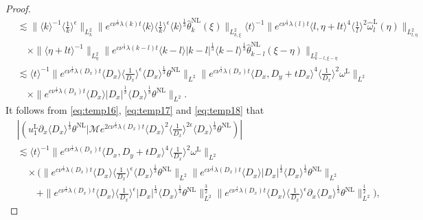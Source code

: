 \documentclass[reqno, 12pt]{amsart} %
\theoremstyle{plain} %
\theoremstyle{definition}
\theoremstyle{remark}
\numberwithin{equation}{section} %
\newcommand{\px}{\partial_x}
\begin{document}
\begin{proof}
\begin{equation}
\begin{aligned}
				&\lesssim\|\langle k\rangle^{-1}\langle\frac{1}{k}\rangle^\epsilon\|_{L_k^2}\|e^{c \nu^{\frac{1}{3}} \lambda(k) t}\langle k\rangle\langle\frac{1}{k}\rangle^\epsilon \langle k \rangle^\frac13 \hat{\theta}_k^{\mathrm{NL}}(\xi)\|_{L_{k, \xi}^2}\langle t\rangle^{-1}\|e^{c \nu^{\frac{1}{3}} \lambda(l) t}\langle l, \eta+l t\rangle^4\langle\frac{1}{l}\rangle^2 \hat{\omega}_l^{\mathrm{L}}(\eta)\|_{L_{l, \eta}^2} \\
				&\quad \times\|\langle\eta+l t\rangle^{-1}\|_{L_\eta^2}\|e^{c \nu^{\frac{1}{3}} \lambda(k-l) t} \langle k-l \rangle   |k-l|^{\frac{1}{3}} \langle k-l \rangle^\frac13  \hat{\theta}_{k-l}^{\mathrm{NL}}(\xi-\eta)\|_{L_{k-l, \xi-\eta}^2} \\
				& \lesssim \langle t\rangle^{-1}\|e^{c \nu^{\frac{1}{3}} \lambda\left(D_x\right) t}\langle D_x\rangle\langle\frac{1}{D_x}\rangle^\epsilon \langle D_x \rangle^\frac13 \theta^{\mathrm{NL}}\|_{L^2}\|e^{c \nu^{\frac{1}{3}} \lambda\left(D_x\right) t}\langle D_x, D_y+t D_x\rangle^4\langle\frac{1}{D_x}\rangle^2 \omega^{\mathrm{L}}\|_{L^2} \\
				& \quad \times  \| e^{c \nu^{\frac{1}{3}} \lambda\left(D_x\right) t} \langle D_x \rangle
				\left|D_x\right|^{\frac{1}{3}}  \langle D_x \rangle^\frac13  \theta^{\mathrm{NL}} \|_{L^2} .
		\end{aligned}\end{equation}
		It follows from \eqref{eq:temp16}, \eqref{eq:temp17} and \eqref{eq:temp18} that
		\begin{equation*}\begin{aligned}
				&\left|\left(  u_1^{\mathrm{L}} \px \langle D_x \rangle^\frac13 \theta^{\mathrm{NL}} \big| \mathcal{M} e^{2 c \nu^{\frac{1}{3}} \lambda\left(D_x\right) t}\langle D_x\rangle^2\langle\frac{1}{D_x}\rangle^{2 \epsilon} \langle D_x \rangle^\frac13 \theta^{\mathrm{NL}}\right)\right|\\
				&\lesssim \langle t\rangle^{-1}     \|e^{c \nu^{\frac{1}{3}} \lambda\left(D_x\right) t}\langle D_x, D_y+t D_x\rangle^4\langle\frac{1}{D_x}\rangle^2 \omega^{\mathrm{L}}\|_{L^2} \\
				& \quad \times (\|e^{c \nu^{\frac{1}{3}} \lambda\left(D_x\right) t}\langle D_x\rangle\langle\frac{1}{D_x}\rangle^\epsilon \langle D_x \rangle^\frac13 \theta^{\mathrm{NL}}\|_{L^2}  \| e^{c \nu^{\frac{1}{3}} \lambda\left(D_x\right) t} \langle D_x \rangle
				\left|D_x\right|^{\frac{1}{3}} \langle D_x \rangle^\frac13 \theta^{\mathrm{NL}} \|_{L^2} \\
				&\qquad + \|e^{c \nu^{\frac{1}{3}} \lambda\left(D_x\right) t}\langle D_x\rangle\langle\frac{1}{D_x}\rangle^\epsilon\left|D_x\right|^{\frac{1}{3}}  \langle D_x \rangle^\frac13 \theta^{\mathrm{NL}}\|_{L^2}^{\frac{3}{2}}   \|e^{c \nu^{\frac{1}{3}} \lambda\left(D_x\right) t}\langle D_x\rangle\langle\frac{1}{D_x}\rangle^\epsilon \px \langle D_x \rangle ^\frac13  \theta^{\mathrm{NL}}\|_{L^2}^{\frac{1}{2}}),

\end{aligned}
\end{equation*}
\end{proof}
\end{document}
